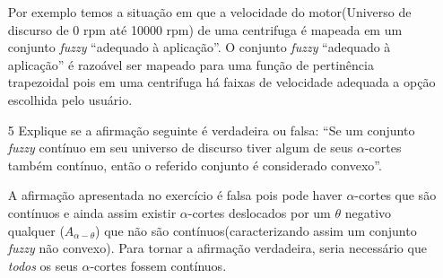 \documentclass{report}
\begin{document}
\begin{enumerate}
Por exemplo temos a situação em que a velocidade do motor(Universo de discurso de 0 rpm até 10000 rpm) de uma centrifuga é mapeada 
em um conjunto \emph{fuzzy} ``adequado à aplicação''. O conjunto \emph{fuzzy} ``adequado à aplicação'' é razoável ser mapeado
para uma função de pertinência trapezoidal pois em uma centrifuga há faixas de velocidade adequada a opção escolhida pelo usuário.


\item[5] Explique se a afirmação seguinte é verdadeira ou falsa: “Se um conjunto \emph{fuzzy} contínuo em
seu universo de discurso tiver algum de seus $\alpha$-cortes também contínuo, então o referido
conjunto é considerado convexo”.

A afirmação apresentada no exercício é falsa pois pode haver $\alpha$-cortes que são contínuos e ainda assim 
existir $\alpha$-cortes deslocados por um $\theta$ negativo qualquer ($A_{\alpha-\theta}$) que não são contínuos(caracterizando
assim um conjunto \emph{fuzzy} não convexo). Para tornar a afirmação verdadeira, seria necessário que \emph{todos} os seus $\alpha$-cortes 
fossem contínuos.


\end{enumerate}
\end{document}
